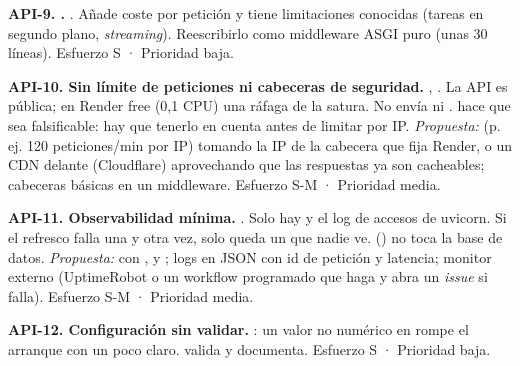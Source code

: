 \textbf{API-9. .} . Añade coste por petición y tiene limitaciones conocidas (tareas en segundo plano, \emph{streaming}). Reescribirlo como middleware ASGI puro (unas 30 líneas). Esfuerzo S · Prioridad baja.

\textbf{API-10. Sin límite de peticiones ni cabeceras de seguridad.} , . La API es pública; en Render free (0,1 CPU) una ráfaga de  la satura. No envía  ni .  hace que  sea falsificable: hay que tenerlo en cuenta antes de limitar por IP. \emph{Propuesta:}  (p. ej. 120 peticiones/min por IP) tomando la IP de la cabecera que fija Render, o un CDN delante (Cloudflare) aprovechando que las respuestas ya son cacheables; cabeceras básicas en un middleware. Esfuerzo S-M · Prioridad media.

\textbf{API-11. Observabilidad mínima.} . Solo hay  y el log de accesos de uvicorn. Si el refresco falla una y otra vez, solo queda un  que nadie ve.  () no toca la base de datos. \emph{Propuesta:}  con ,  y ; logs en JSON con id de petición y latencia; monitor externo (UptimeRobot o un workflow programado que haga  y abra un \emph{issue} si falla). Esfuerzo S-M · Prioridad media.

\textbf{API-12. Configuración sin validar.} : un valor no numérico en  rompe el arranque con un  poco claro.  valida y documenta. Esfuerzo S · Prioridad baja.

